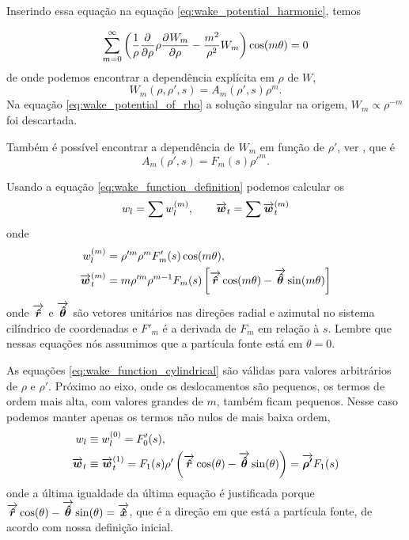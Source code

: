 Inserindo essa equação na equação \eqref{eq:wake_potential_harmonic}, temos

\begin{equation}
	\sum_{m=0}^\infty \left(\frac1\rho\frac{\partial^{{}}}{\partial \rho^{{}}}\rho\frac{\partial^{{}}W_m}{\partial \rho^{{}}} -
    					    \frac{m^2}{\rho^2}W_m\right)\cos(m\theta) = 0
\end{equation}
de onde podemos encontrar a dependência explícita em $\rho$ de $W$,
\begin{equation}\label{eq:wake_potential_of_rho}
	W_m(\rho,\rho',s) = A_m(\rho',s)\rho^m.
\end{equation}
Na equação \eqref{eq:wake_potential_of_rho} a solução singular na origem, $W_m \propto \rho^{-m}$ foi descartada.

Também é possível encontrar a dependência de $W_m$ em função de $\rho'$,  ver \cite{Bane_PAC1983}, que é
\begin{equation}
	A_m(\rho',s) = F_m(s)\rho'^m.
\end{equation}

Usando a equação \eqref{eq:wake_function_definition} podemos calcular os 
\begin{equation}
	w_l = \sum w_l^{(m)}, \qquad \overrightarrow{\boldsymbol{w}}_t = \sum \overrightarrow{\boldsymbol{w}}_t^{(m)}
\end{equation}
onde
\begin{equation}\label{eq:wake_function_cylindrical}\begin{aligned}
w_l^{(m)} &= \rho'^m\rho^mF'_m(s)\cos(m\theta),\\
\overrightarrow{\boldsymbol{w}}_t^{(m)} &= m\rho'^m\rho^{m-1} F_m(s)\left[\overrightarrow{\boldsymbol{\hat{r}}}\cos(m\theta) -
												  \overrightarrow{\boldsymbol{\hat{\theta}}}\sin(m\theta)\right]
\end{aligned}\end{equation}
onde $\overrightarrow{\boldsymbol{\hat{r}}}$ e $\overrightarrow{\boldsymbol{\hat{\theta}}}$ são vetores unitários nas direções radial e azimutal no sistema cilíndrico de coordenadas e $F'_m$ é a derivada de $F_m$ em relação à $s$. Lembre que nessas equações nós assumimos que a partícula fonte está em $\theta = 0$.

As equações \eqref{eq:wake_function_cylindrical} são válidas para valores arbitrários de $\rho$ e $\rho'$. Próximo ao eixo, onde os deslocamentos são pequenos, os termos de ordem mais alta, com valores grandes de $m$, também ficam pequenos. Nesse caso podemos manter apenas os termos não nulos de mais baixa ordem,
\begin{equation}\label{eq:wake_function_expanded}\begin{aligned}
	w_l & \equiv w_l^{(0)} = F'_0(s), \\
    \overrightarrow{\boldsymbol{w}}_t & \equiv \overrightarrow{\boldsymbol{w}}_t^{(1)} = F_1(s)\rho'\left(\overrightarrow{\boldsymbol{\hat{r}}}\cos(\theta) - \overrightarrow{\boldsymbol{\hat{\theta}}}\sin(\theta)\right) = \overrightarrow{\boldsymbol{\rho'}} F_1(s)
\end{aligned}\end{equation}
onde a última igualdade da última equação é justificada porque $\overrightarrow{\boldsymbol{\hat{r}}}\cos(\theta) - \overrightarrow{\boldsymbol{\hat{\theta}}}\sin(\theta) = \overrightarrow{\boldsymbol{\hat{x}}}$, que é a direção em que está a partícula fonte, de acordo com nossa definição inicial.

